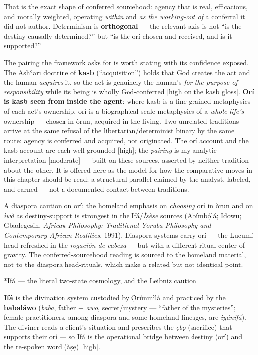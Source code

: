 \documentclass[11pt]{article}
\makeatletter
\renewcommand\paragraph{\@startsection{paragraph}{4}{\z@}{2ex plus 1ex}{0.4ex}{\normalfont\normalsize\bfseries}}
\makeatother
\begin{document}
That is the exact shape of conferred sourcehood: agency that is real, efficacious, and morally weighted, operating \emph{within} and \emph{as the working-out of} a conferral it did not author. Determinism is \textbf{orthogonal} — the relevant axis is not ``is the destiny causally determined?'' but ``is the orí chosen-and-received, and is it supported?''

The pairing the framework asks for is worth stating with its confidence exposed. The Ashʿarī doctrine of \textbf{kasb} (``acquisition'') holds that God creates the act and the human \emph{acquires} it, so the act is genuinely the human's \emph{for the purpose of responsibility} while its being is wholly God-conferred [high on the kasb gloss]. \textbf{Orí is kasb seen from inside the agent}: where kasb is a fine-grained metaphysics of each act's ownership, orí is a biographical-scale metaphysics of a \emph{whole life's} ownership — chosen in òrun, acquired in the living. Two unrelated traditions arrive at the same refusal of the libertarian/\allowbreak{}determinist binary by the same route: agency is conferred and acquired, not originated. The orí account and the kasb account are each well grounded [high]; the \emph{pairing} is my analytic interpretation [moderate] — built on these sources, asserted by neither tradition about the other. It is offered here as the model for how the comparative moves in this chapter should be read: a structural parallel claimed by the analyst, labeled, and earned — not a documented contact between traditions.

A diaspora caution on orí: the homeland emphasis on \emph{choosing} orí in òrun and on \emph{ìwà} as destiny-support is strongest in the Ifá/\allowbreak{}\emph{Ìṣẹ̀ṣe} sources (Abímbọ́lá; Idowu; Gbadegesin, \emph{African Philosophy: Traditional Yoruba Philosophy and Contemporary African Realities}, 1991). Diaspora systems carry orí — the Lucumí head refreshed in the \emph{rogación de cabeza} — but with a different ritual center of gravity. The conferred-sourcehood reading is sourced to the homeland material, not to the diaspora head-rituals, which make a related but not identical point. 

\paragraph*{Ifá — the literal two-state cosmology, and the Leibniz caution}

\textbf{Ifá} is the divination system custodied by Ọ̀rúnmìlà and practiced by the \textbf{babaláwo} (\emph{baba}, father + \emph{awo}, secret/\allowbreak{}mystery — ``father of the mysteries''; female practitioners, among diaspora and some homeland lineages, are \emph{ìyánífá}). The diviner reads a client's situation and prescribes the \emph{ẹbọ} (sacrifice) that supports their orí — so Ifá is the operational bridge between destiny (orí) and the re-spoken word (àṣẹ) [high].
\end{document}
